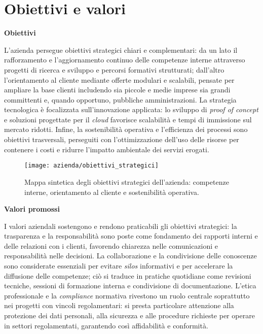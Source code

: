 \section{Obiettivi e valori}

\medskip
\noindent\textbf{Obiettivi}

L'azienda persegue obiettivi strategici chiari e complementari: da un lato il rafforzamento e l'aggiornamento continuo delle competenze interne attraverso progetti di ricerca e sviluppo e percorsi formativi
strutturati; dall'altro l'orientamento al cliente mediante offerte modulari e scalabili, pensate per ampliare la base clienti includendo sia piccole e medie imprese sia grandi committenti e,
quando opportuno, pubbliche amministrazioni. 
La strategia tecnologica è focalizzata sull'innovazione applicata: lo sviluppo di \emph{proof of concept} e soluzioni progettate per il \emph{cloud} favorisce
scalabilità e tempi di immissione sul mercato ridotti. 
Infine, la sostenibilità operativa e l'efficienza dei processi sono obiettivi trasversali, perseguiti con l'ottimizzazione dell'uso
delle risorse per contenere i costi e ridurre l'impatto ambientale dei servizi erogati.

\begin{figure}[htbp]
    \centering
    \texttt{[image: azienda/obiettivi\_strategici]}
    \caption{Mappa sintetica degli obiettivi strategici dell’azienda: competenze interne, orientamento al cliente e sostenibilità operativa.}
    \label{fig:obiettivi}
  \end{figure}

\medskip
\noindent\textbf{Valori promossi}

I valori aziendali sostengono e rendono praticabili gli obiettivi strategici: la trasparenza e la responsabilità sono poste come fondamento dei
rapporti interni e delle relazioni con i clienti, favorendo chiarezza nelle comunicazioni e responsabilità nelle decisioni. La collaborazione e
la condivisione delle conoscenze sono considerate essenziali per evitare \emph{silos} informativi e per accelerare la diffusione delle competenze;
ciò si traduce in pratiche quotidiane come revisioni tecniche, sessioni di formazione interna e condivisione di documentazione.
L'etica professionale e la \emph{compliance} normativa rivestono un ruolo centrale soprattutto nei progetti con vincoli regolamentari:
si presta particolare attenzione alla protezione dei dati personali, alla sicurezza e alle procedure richieste per operare in settori regolamentati, garantendo così affidabilità e conformità.



